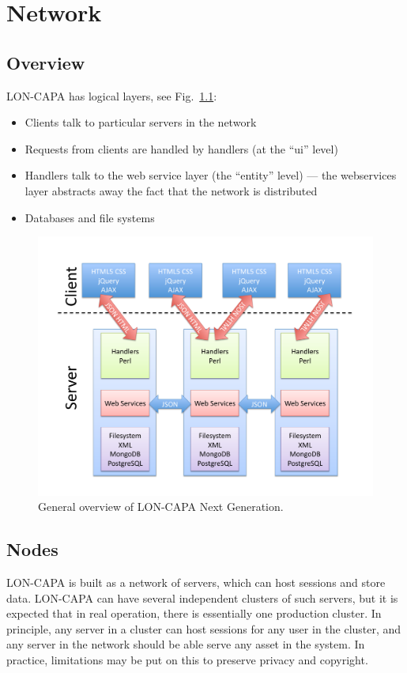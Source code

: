 \chapter{Network}

\section{Overview}
LON-CAPA has logical layers, see Fig.~\ref{fig:overview}:
\begin{itemize}
\item Clients talk to particular servers in the network
\item Requests from clients are handled by handlers (at the ``ui'' level)
\item Handlers talk to the web service layer (the ``entity'' level) --- the webservices layer abstracts away the fact that the network is distributed
\item Databases and file systems
\end{itemize} 

\begin{figure}
\begin{center}
\includegraphics[width=12cm]{overview}
\end{center}
\caption{General overview of LON-CAPA Next Generation.\label{fig:overview}} 
\end{figure}

\section{Nodes}
LON-CAPA is built as a network of servers, which can host sessions and store data. LON-CAPA can have several independent clusters of such servers, but it is expected that in real operation, there is essentially one production cluster. In principle, any server in a cluster can host sessions for any user in the cluster, and any server in the network should be able serve any asset in the system. In practice, limitations may be put on this to preserve privacy and copyright.

